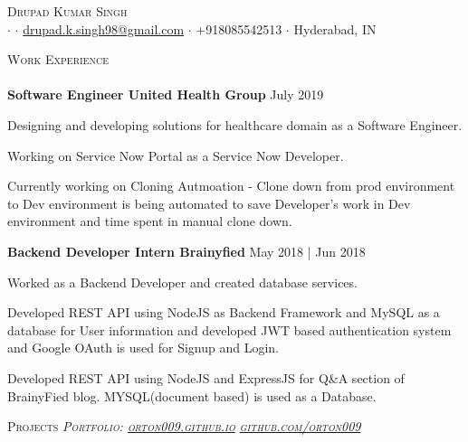 \documentclass[a4paper]{article}
\newcommand{\lineunder} {
    \vspace*{-8pt} \\
    \hspace*{-18pt} \hrulefill \\
}
\newcommand{\header} [1] {
    {\hspace*{-18pt}\vspace*{6pt} \textsc{#1}}
    \vspace*{-6pt} \lineunder
}
\begin{document}
\vspace*{-10mm}

\begin{center}
	{\Huge \scshape {Drupad Kumar Singh}}\\
	\href{https://www.linkedin.com/in/drupad-singh-14337712b/}{\faLinkedin}
	$\cdot$
	\href{https://github.com/orton009}{\faGithub}
	$\cdot$
	\href{mailto:drupad.k.singh98@gmail.com}{drupad.k.singh98@gmail.com} $\cdot$ +918085542513 $\cdot$ Hyderabad, IN \\
\end{center}
\vspace*{1mm}
\header{Work Experience}
\textbf{Software Engineer  \hfill United Health Group} \hfill July 2019\\
\vspace{-1mm}
\begin{itemize} \itemsep 1pt
	\small{\item Designing and developing solutions for healthcare domain as a Software Engineer.}
	\small{\item Working on Service Now Portal as a Service Now Developer.}
	\small{\item  Currently working on Cloning Autmoation - Clone down from prod environment to Dev environment is being automated to save Developer's work in Dev environment and time spent in manual clone down. }
\end{itemize}
\vspace{0mm}

\textbf{Backend Developer Intern  \hfill Brainyfied} \hfill May 2018 | Jun 2018\\
\vspace{-1mm}
\begin{itemize} \itemsep 1pt
	\small{\item Worked as a Backend Developer and created database services.}
	\small{\item Developed REST API using NodeJS as Backend Framework and MySQL as a database for User information and developed JWT based authentication system and Google OAuth is used for Signup and Login.}
	\small{\item  Developed REST API using NodeJS and ExpressJS for Q&A section of BrainyFied blog. MYSQL(document based) is used as a Database.}
\end{itemize}
\vspace{0mm}

\header{Projects \hfill \sl \small{Portfolio: \href{http://orton009.github.io}{orton009.github.io}} \hfill \faGithub \sl \small{ \href{https://github.com/orton009}{github.com/orton009}}}
\end{document}

